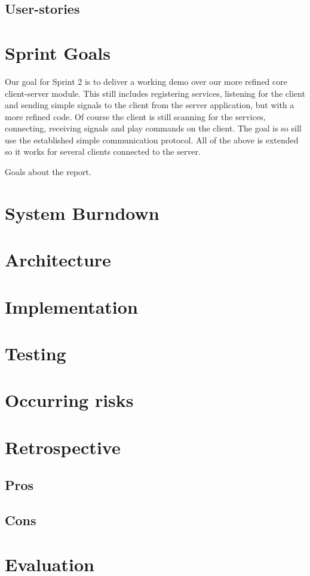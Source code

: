 \subsection{User-stories}

\section{Sprint Goals}
Our goal for Sprint 2 is to deliver a working demo over our more refined core client-server module. 
This still includes registering services, listening for the client and sending simple signals to the client from the server application, but with a more refined code. Of course the client is still scanning for the services, connecting, receiving signals and play commands on the client. The goal is so sill use the established simple communication protocol. All of the above is extended so it works for several clients connected to the server.

Goals about the report.

\section{System Burndown}
\section{Architecture}
\section{Implementation}
\section{Testing}
\section{Occurring risks}
\section{Retrospective}
\subsection{Pros}
\subsection{Cons}
\section{Evaluation}